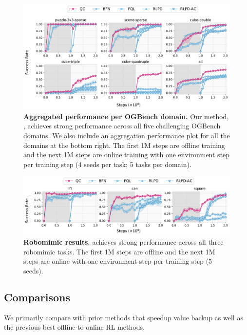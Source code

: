 \begin{figure}[t]
    \centering
    \includegraphics[width=\linewidth]{figures/main-all-ablation.pdf}
    \caption{\footnotesize \textbf{Aggregated performance per OGBench domain.} Our method, , achieves strong performance across all five challenging OGBench domains. We also include an aggregation performance plot for all the domains at the bottom right. The first 1M steps are offline training and the next 1M steps are online training with one environment step per training step (4 seeds per task; 5 tasks per domain).}
    \label{fig:main}
\end{figure}


\begin{figure}[t]
    \centering
    \includegraphics[width=\linewidth]{figures/robomimic-all-ablation.pdf}
    \caption{\footnotesize \textbf{Robomimic results.}  achieves strong performance across all three robomimic tasks. The first 1M steps are offline and the next 1M steps are online with one environment step per training step (5 seeds).}
    \label{fig:main-robomimic}
\end{figure}



\subsection{Comparisons}
We primarily compare with prior methods that speedup value backup as well as the previous best offline-to-online RL methods.


